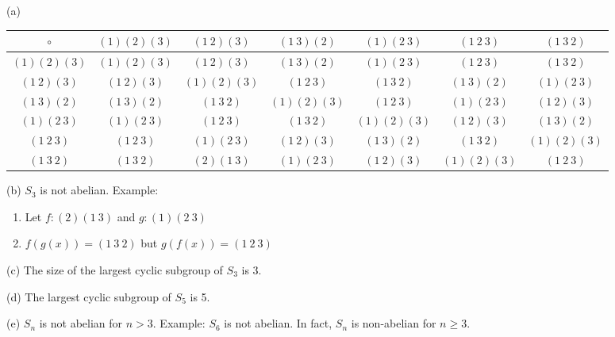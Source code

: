 
\newpage
(a)
\begin{longtable}{|c||c|c|c|c|c|c|}
  \hline
$\circ$       & $(1)(2)(3)$ & $(1 \ 2)(3)$ & $(1 \ 3)(2)$ & $(1)(2 \ 3)$ & $(1 \ 2 \ 3)$ & $(1 \ 3 \ 2)$ \\ \hline \hline
$(1)(2)(3)$   & $(1)(2)(3)$ & $(1 \ 2)(3)$ & $(1 \ 3)(2)$ & $(1)(2 \ 3)$ & $(1 \ 2 \ 3)$ & $(1 \ 3 \ 2)$ \\ \hline 
$(1 \ 2)(3)$  & $(1 \ 2)(3)$& $(1)(2)(3)$  & $(1 \ 2 \ 3)$& $(1 \ 3 \ 2)$& $(1 \ 3)(2)$  & $(1)(2 \ 3)$  \\ \hline
$(1 \ 3)(2)$  & $(1 \ 3)(2)$& $(1 \ 3 \ 2)$& $(1)(2)(3)$  & $(1 \ 2 \ 3)$& $(1)(2 \ 3)$  & $(1 \ 2)(3)$  \\ \hline
$(1)(2 \ 3)$  & $(1)(2 \ 3)$& $(1 \ 2 \ 3)$& $(1 \ 3 \ 2)$& $(1)(2)(3)$  & $(1 \ 2)(3)$  & $(1 \ 3)(2)$  \\ \hline
$(1 \ 2 \ 3)$ &$(1 \ 2 \ 3)$& $(1)(2 \ 3)$ & $(1 \ 2)(3)$ & $(1 \ 3)(2)$ & $(1 \ 3 \ 2)$ & $(1)(2)(3)$   \\ \hline
$(1 \ 3 \ 2)$ &$(1 \ 3 \ 2)$& $(2)(1 \ 3)$ & $(1)(2 \ 3)$ & $(1 \ 2)(3)$ & $(1)(2)(3)$   & $(1 \ 2 \ 3)$ \\ \hline
\end{longtable}

(b)
$S_3$ is not abelian. Example:
\begin{enumerate}[nosep]
\item[] Let $f:(2)(1 \ 3)$ and $g:(1)(2 \ 3)$
\item[] $f(g(x)) = (1 \ 3 \ 2)$ but $g(f(x)) = (1 \ 2 \ 3)$
\end{enumerate}

(c)
The size of the largest cyclic subgroup of $S_3$ is 3.

(d)
The largest cyclic subgroup of $S_5$ is 5.

(e)
$S_n$ is not abelian for $n > 3$. Example: $S_6$ is not abelian. In fact, $S_n$ is non-abelian for $n \geq 3$.
